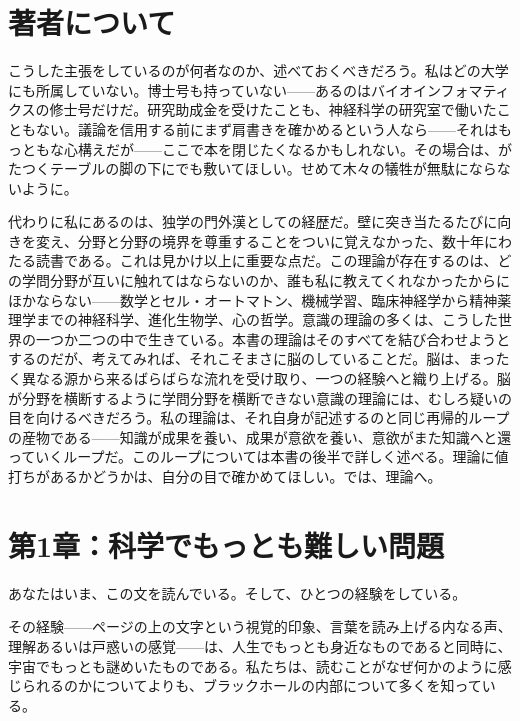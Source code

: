 \documentclass[11pt, twoside, openright]{book}
\begin{document}
\chapter*{著者について}

こうした主張をしているのが何者なのか、述べておくべきだろう。私はどの大学にも所属していない。博士号も持っていない------あるのはバイオインフォマティクスの修士号だけだ。研究助成金を受けたことも、神経科学の研究室で働いたこともない。議論を信用する前にまず肩書きを確かめるという人なら------それはもっともな心構えだが------ここで本を閉じたくなるかもしれない。その場合は、がたつくテーブルの脚の下にでも敷いてほしい。せめて木々の犠牲が無駄にならないように。

代わりに私にあるのは、独学の門外漢としての経歴だ。壁に突き当たるたびに向きを変え、分野と分野の境界を尊重することをついに覚えなかった、数十年にわたる読書である。これは見かけ以上に重要な点だ。この理論が存在するのは、どの学問分野が互いに触れてはならないのか、誰も私に教えてくれなかったからにほかならない------数学とセル・オートマトン、機械学習、臨床神経学から精神薬理学までの神経科学、進化生物学、心の哲学。意識の理論の多くは、こうした世界の一つか二つの中で生きている。本書の理論はそのすべてを結び合わせようとするのだが、考えてみれば、それこそまさに脳のしていることだ。脳は、まったく異なる源から来るばらばらな流れを受け取り、一つの経験へと織り上げる。脳が分野を横断するように学問分野を横断できない意識の理論には、むしろ疑いの目を向けるべきだろう。私の理論は、それ自身が記述するのと同じ再帰的ループの産物である------知識が成果を養い、成果が意欲を養い、意欲がまた知識へと還っていくループだ。このループについては本書の後半で詳しく述べる。理論に値打ちがあるかどうかは、自分の目で確かめてほしい。では、理論へ。


\mainmatter
\pagestyle{fancy}
\chapter*{第1章：科学でもっとも難しい問題}

あなたはいま、この文を読んでいる。そして、ひとつの経験をしている。

その経験------ページの上の文字という視覚的印象、言葉を読み上げる内なる声、理解あるいは戸惑いの感覚------は、人生でもっとも身近なものであると同時に、宇宙でもっとも謎めいたものである。私たちは、読むことがなぜ何かのように感じられるのかについてよりも、ブラックホールの内部について多くを知っている。
\end{document}
